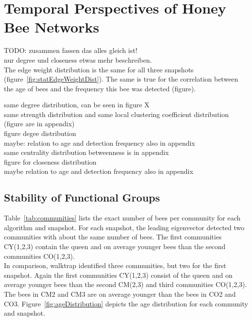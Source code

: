 \section{Temporal Perspectives of Honey Bee Networks}

TODO: zusammen fassen das alles gleich ist!\\
nur degree und closeness etwas mehr beschreiben.\\
The edge weight distribution is the same for all three snapshots (figure~\ref{fig:statEdgeWeightDist}).
The same is true for the correlation between the age of bees and the frequency this bee was detected (figure).


same degree distribution, can be seen in figure X\\
same strength distribution and same local clustering coefficient distribution (figure are in appendix)\\
figure degee distribution\\
maybe: relation to age and detection frequency also in appendix\\



same centrality distribution betweenness is in appendix\\
figure for closeness distribution\\
maybe relation to age and detection frequency also in appendix\\



\subsection{Stability of Functional Groups}
Table~\ref{tab:communities} lists the exact number of bees per community for each algorithm and snapshot.
For each snapshot, the leading eigenvector detected two communities with about the same number of bees.
The first communities CY(1,2,3) contain the queen and on average younger bees than the second communities CO(1,2,3).\\
In comparison, walktrap identified three communities, but two for the first snapshot.
Again the first communities CY(1,2,3) consist of the queen and on average younger bees than the second CM(2,3) and third communities CO(1,2,3).
The bees in CM2 and CM3 are on average younger than the bees in CO2 and CO3.
Figure~\ref{fig:ageDistribution} depicts the age distribution for each community and snapshot.

